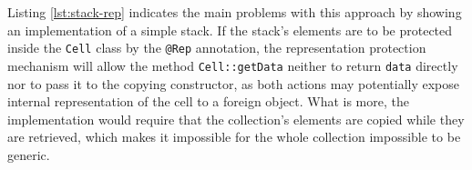\documentclass{pracamgr}
\theoremstyle{break}
\theoremstyle{break}
\theoremstyle{break}
\begin{document}
Listing \ref{lst:stack-rep} indicates the main problems with this
approach by showing an implementation of a simple stack. If the
stack's elements are to be protected inside the \texttt{Cell} class by
the \texttt{@Rep} annotation, the representation protection mechanism
will allow the method \texttt{Cell::getData} neither to return
\texttt{data} directly nor to pass it to the copying constructor, as
both actions may potentially expose internal representation of the
cell to a foreign object. What is more, the implementation would
require that the collection's elements are copied while they are
retrieved, which makes it impossible for the whole collection
impossible to be generic.


\end{document}

